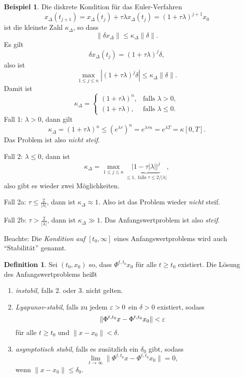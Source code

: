 \documentclass[
 a4paper,
 12pt,
 parskip=half
 ]{scrreprt}
\theoremstyle{plain}
\theoremstyle{definition}
\numberwithin{rmrk}{chapter}
\numberwithin{defn}{chapter}
\numberwithin{exmp}{chapter}
\numberwithin{prgp}{subsection}
\newtheorem*{exmp*}{Beispiel}
\newtheorem*{defn*}{Definition}
\numberwithin{equation}{chapter}
\begin{document}
\begin{exmp*}
  Die diskrete Kondition für das Euler-Verfahren
  \[ x_\Delta(t_{j+1}) = x_\Delta(t_j) + \tau \lambda x_\Delta(t_j)
    = (1 + \tau \lambda)^{j+1} x_0 \]
  ist die kleinste Zahl $\kappa_\Delta$, so dass
  \[ \| \delta x_\Delta \| \le \kappa_\Delta \| \delta \|. \]
  Es gilt
  \[ \delta x_\Delta(t_j) = (1 + \tau \lambda)^j \delta, \]
  also ist
  \[ \max_{1 \le j \le n} |(1+\tau \lambda)^j \delta | \le \kappa_\Delta \|
    \delta \|. \]
  Damit ist
  \[ \kappa_\Delta = \begin{cases}
      (1+\tau \lambda)^n, &\text{falls } \lambda > 0, \\
      (1+\tau \lambda), &\text{falls } \lambda \le 0.
    \end{cases}
  \]
  Fall 1: $\lambda > 0$, dann gilt
  \[ \kappa_\Delta = (1 + \tau \lambda)^n \le (e^{\lambda \tau})^n = e^{\lambda
      \tau n } = e^{\lambda T} = \kappa[0,T]. \]
  Das Problem ist also \emph{nicht steif}.

  Fall 2: $\lambda \le 0$, dann ist
  \[ \kappa_\Delta = \max_{1 \le j \le n} \underbrace{|1 - \tau
      |\lambda||^j}_{\le 1, \text{ falls } \tau \le 2/|\lambda|}, \]
  also gibt es wieder zwei Möglichkeiten.

  Fall 2a: $\tau \le \frac{2}{|\lambda|}$, dann ist $\kappa_\Delta \approx 1$.
  Also ist das Problem wieder \emph{nicht} steif.

  Fall 2b: $\tau > \frac{2}{|\lambda|}$, dann ist $\kappa_\Delta \gg 1$. Das
  Anfangswertproblem ist also \emph{steif}.  
\end{exmp*}

Beachte: Die \emph{Kondition auf $[t_0, \infty]$} eines Anfangswertproblems wird
auch ``Stabilität'' genannt.

\begin{defn*}
  Sei $(t_0,x_0)$ so, dass $\Phi^{t,t_0}x_0$ für alle $t \ge t_0$ existiert. Die
  Lösung des Anfangswertproblems heißt
  \begin{enumerate}
  \item \emph{instabil}, falls 2. oder 3. nicht gelten.
  \item \emph{Lyapunov-stabil}, falls zu jedem $\varepsilon > 0$ ein $\delta > 0$
    existiert, sodass 
    \[ \| \Phi^{t,t_0} x - \Phi^{t,t_0} x_0 \| < \varepsilon \]
    für alle $t \ge t_0$ und $\| x - x_0 \| < \delta$.
  \item \emph{asymptotisch stabil}, falls es zusätzlich ein $\delta_0$ gibt,
    sodass
    \[ \lim_{t \to \infty} \| \Phi^{t,t_0} x - \Phi^{t,t_0} x_0 \| = 0, \]
    wenn $\| x - x_0 \| \le \delta_0$.
  \end{enumerate}
\end{defn*}
\end{document}
